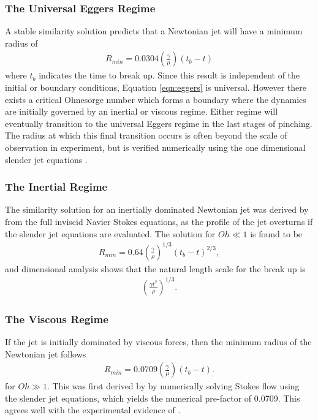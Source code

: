 \documentclass[11pt]{article}
\begin{document}
\subsubsection{The Universal Eggers Regime}
A stable similarity solution predicts that a Newtonian jet will have a minimum 
radius of
\begin{align}
R_{min} = 0.0304 \left( \frac{\gamma}{\mu} \right) \left(t_b - t \right)
\label{eqn:eggers}
\end{align}
where $t_b$ indicates the time to break up. Since this result is independent of 
the initial or boundary conditions, Equation \ref{eqn:eggers} is universal. 
However there exists a critical Ohnesorge number which forms a boundary where 
the dynamics are initially governed by an inertial or viscous regime. Either 
regime will eventually transition to the universal Eggers regime in the last 
stages of pinching. The radius at which this final transition occurs is often 
beyond the scale of observation in experiment, but is verified numerically 
using the one dimensional slender jet equations \citep{hall2015report}.

\subsubsection{The Inertial Regime}
The similarity solution for an inertially dominated Newtonian jet was derived 
by \cite{day1998self} from the full inviscid Navier Stokes equations, as the 
profile of the jet overturns if the slender jet equations are evaluated. The 
solution for $Oh \ll 1$ is found to be
\begin{align}
R_{min} = 0.64 \left( \frac{\gamma}{\rho}\right)^{1/3} \left(t_b - t 
\right)^{2/3},
\end{align}
and dimensional analysis shows that the natural length scale for the break up 
is
\begin{align*}
\left( \frac{\gamma t^2}{\rho} \right)^{1/3}.
\end{align*}

\subsubsection{The Viscous Regime}
If the jet is initially dominated by viscous forces, then the minimum radius of 
the Newtonian jet follows
\begin{align}
R_{min} = 0.0709 \left( \frac{\gamma}{\mu} \right) \left(t_b -t \right).
\end{align}
for $Oh \gg 1$. This was first derived by \cite{papageorgiou1995breakup} by 
numerically solving Stokes flow using the slender jet equations, which yields 
the numerical pre-factor of 0.0709. This agrees well with the experimental 
evidence of \cite{mckinley2000extract}.
\end{document}
